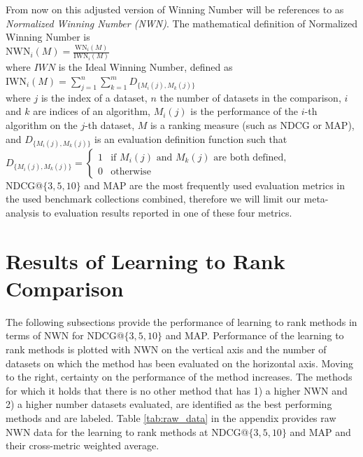 \documentclass{llncs}
\begin{document}
From now on this adjusted version of Winning Number will be references to as \emph{Normalized Winning Number (NWN)}. The mathematical definition of Normalized Winning Number is\\
$\text{NWN}_i(M) = \frac{\text{WN}_i(M)}{\text{IWN}_i(M)}$\\
\noindent
where $IWN$ is the Ideal Winning Number, defined as\\
$\text{IWN}_i(M) = \sum\nolimits_{j=1}^n \sum\nolimits_{k=1}^m D_{\{M_i(j),M_k(j)\}}$\\
where $j$ is the index of a dataset, $n$ the number of datasets in the comparison, $i$ and $k$ are indices of an algorithm, $M_i(j)$ is the performance of the $i$-th algorithm on the $j$-th dataset, $M$ is a ranking measure (such as NDCG or MAP), and $D_{\{M_i(j),M_k(j)\}}$ is an evaluation definition function such that\\
$D_{\{M_i(j),M_k(j)\}} = \begin{cases}
1 & \text{if } M_i(j) \text{ and } M_k(j) \text{ are both defined}, \\
0 & \text{otherwise}
\end{cases}$\\
NDCG@$\{3,5,10\}$ and MAP are the most frequently used evaluation metrics in the used benchmark collections combined, therefore we will limit our meta-analysis to evaluation results reported in one of these four metrics.
\section{Results of Learning to Rank Comparison}
The following subsections provide the performance of learning to rank methods in terms of NWN for NDCG@$\{3,5,10\}$ and MAP. Performance of the learning to rank methods is plotted with NWN on the vertical axis and the number of datasets on which the method has been evaluated on the horizontal axis. Moving to the right, certainty on the performance of the method increases. The methods for which it holds that there is no other method that has 1) a higher NWN and 2) a higher number datasets evaluated, are identified as the best performing methods and are labeled. Table \ref{tab:raw_data} in the appendix provides raw NWN data for the learning to rank methods at NDCG@$\{3,5,10\}$ and MAP and their cross-metric weighted average.
\end{document}
